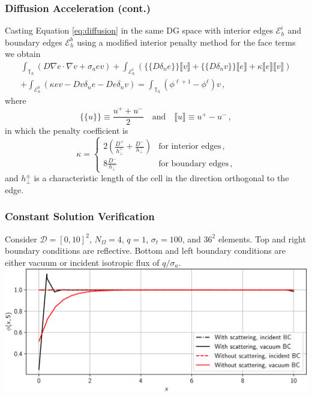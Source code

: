 \documentclass[xcolor={usenames,dvipsnames,svgnames,table}, 10pt]{beamer}
\newcommand{\spatial}{\mathcal{D}} %
\begin{document}
\begin{frame}\frametitle{Diffusion Acceleration (cont.)}
	Casting Equation \eqref{eq:diffusion} in the same DG space with interior edges $\mathcal{E}_h^i$ and boundary edges $\mathcal{E}_h^b$ using a modified interior penalty method for the face terms we obtain
	\begin{multline}
		\int_{\mathbb{T}_h} (D \nabla e \cdot \nabla v + \sigma_a e v) + \int_{\mathcal{E}_h^i} \left( \{\!\!\{ D \delta_n e \}\!\!\} \llbracket v \rrbracket + \{\!\!\{ D \delta_n v \}\!\!\} \llbracket e \rrbracket + \kappa \llbracket e \rrbracket \llbracket v \rrbracket \right) \\
		+ \int_{\mathcal{E}_h^b} \left( \kappa e v - D v \delta_n e - D e \delta_n v \right) = \int_{\mathbb{T}_h} (\phi^{\ell + 1} - \phi^\ell) v\,,
	\end{multline}
	where
	\[
		\{\!\!\{ u \}\!\!\} \equiv \frac{u^+ + u^-}{2} \quad \text{and} \quad \llbracket u \rrbracket \equiv u^+ - u^-\,,
	\]
	in which the penalty coefficient is
	\[
		\kappa = \begin{cases} 2 \left(\frac{D^+}{h^+_\bot} + \frac{D^-}{h^-_\bot}\right) & \text{for~interior~edges}\,, \\ 8 \frac{D^-}{h^-_\bot} & \text{for~boundary~edges}\,, \end{cases}
	\]
	and $h^\pm_\bot$ is a characteristic length of the cell in the direction orthogonal to the edge.
\end{frame}


\begin{frame}\frametitle{Constant Solution Verification}
	Consider $\spatial = [0, 10]^2$, $N_\Omega = 4$, $q = 1$, $\sigma_t = 100$, and $36^2$ elements. Top and right boundary conditions are reflective. Bottom and left boundary conditions are either vacuum or incident isotropic flux of $q / \sigma_a$.
	\vfill
	\includegraphics[width=0.95\linewidth]{plots/constant_solution}
	\vfill
\end{frame}
\end{document}
